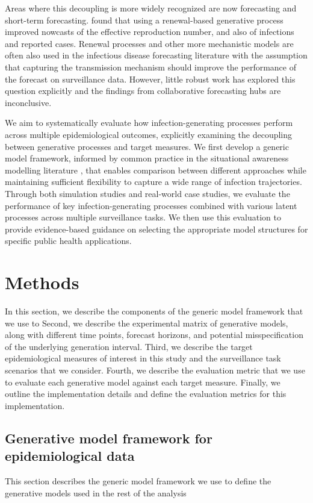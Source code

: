 \documentclass{getwriting}
\begin{document}
Areas where this decoupling is more widely recognized are now forecasting and short-term forecasting. \cite{lison} found that using a renewal-based generative process improved nowcasts of the effective reproduction number, and also of infections and reported cases. Renewal processes and other more mechanistic models are often also used in the infectious disease forecasting literature with the assumption that capturing the transmission mechanism should improve the performance of the forecast on surveillance data. However, little robust work has explored this question explicitly and the findings from collaborative forecasting hubs are inconclusive.

We aim to systematically evaluate how infection-generating processes perform across multiple epidemiological outcomes, explicitly examining the decoupling between generative processes and target measures. We first develop a generic model framework, informed by common practice in the situational awareness modelling literature \cite{abbott2020epinow2, abbott2021epinowcast, scott2021epidemia, Cori2022}, that enables comparison between different approaches while maintaining sufficient flexibility to capture a wide range of infection trajectories. Through both simulation studies and real-world case studies, we evaluate the performance of key infection-generating processes combined with various latent processes across multiple surveillance tasks. We then use this evaluation to provide evidence-based guidance on selecting the appropriate model structures for specific public health applications.

\section{Methods}

In this section, we describe the components of the generic model framework that we use to  Second, we describe the experimental matrix of generative models, along with different time points, forecast horizons, and potential misspecification of the underlying generation interval. Third, we describe the target epidemiological measures of interest in this study and the surveillance task scenarios that we consider. Fourth, we describe the evaluation metric that we use to evaluate each generative model against each target measure. Finally, we outline the implementation details and define the evaluation metrics for this implementation.

\subsection{Generative model framework for epidemiological data}
This section describes the generic model framework we use to define the generative models used in the rest of the analysis
\end{document}
